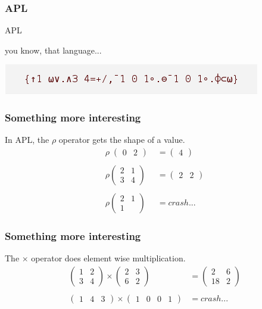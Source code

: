 \documentclass{beamer}
\begin{document}
\begin{frame}[fragile]
    \frametitle{APL}
        \Huge{\centerline{APL}}
        \pause
        \small{\centerline{you know, that language...}}
        \centerline{}
        \centerline{\includegraphics[scale=0.5]{game_of_life.png}}
\end{frame}

\begin{frame}
    \frametitle{Something more interesting}
        In APL, the $\rho$ operator gets the shape of a value.\\
        \begin{align*}
            \rho\;\begin{pmatrix} 0 & 2 \end{pmatrix}\; &= \begin{pmatrix}4\end{pmatrix}\\\\
            \rho \begin{pmatrix} 2 & 1 \\ 3 & 4 \end{pmatrix} &= \begin{pmatrix} 2 & 2\end{pmatrix}\\\\
            \rho \begin{pmatrix} 2 & 1 \\ 1 \end{pmatrix} &= crash...
        \end{align*}
\end{frame}

\begin{frame}
    \frametitle{Something more interesting}
        The $\times$ operator does element wise multiplication.\\
        \begin{align*}
            \begin{pmatrix} 1 & 2\\3 & 4\end{pmatrix} \times \begin{pmatrix} 2 & 3\\6 & 2\end{pmatrix} &=
            \begin{pmatrix} 2 & 6\\18 & 2\end{pmatrix}\\\\
            \begin{pmatrix} 1 & 4 & 3 \end{pmatrix} \times \begin{pmatrix}1 & 0 & 0 & 1 \end{pmatrix} &= crash...
        \end{align*}
\end{frame}
\end{document}
